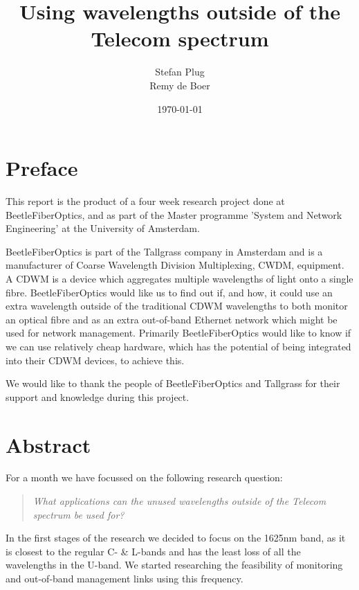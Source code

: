 \documentclass{article}
\begin{document}
\title{Using wavelengths outside of the Telecom spectrum}
\author{Stefan Plug\\Remy de Boer}
\date{\today}
\maketitle

\thispagestyle{empty}
\newpage

\section*{Preface}
This report is the product of a four week research project done at BeetleFiberOptics, and as part of the Master programme 'System and Network Engineering' at the University of Amsterdam\cite{uva:os3}.

BeetleFiberOptics is part of the Tallgrass company in Amsterdam and is a manufacturer of Coarse Wavelength Division Multiplexing, CWDM, equipment. A CDWM is a device which aggregates multiple wavelengths of light onto a single fibre. BeetleFiberOptics would like us to find out if, and how, it could use an extra wavelength outside of the traditional CDWM wavelengths to both monitor an optical fibre and as an extra out-of-band Ethernet network which might be used for network management. Primarily BeetleFiberOptics would like to know if we can use relatively cheap hardware, which has the potential of being integrated into their CDWM devices, to achieve this.

We would like to thank the people of BeetleFiberOptics and Tallgrass for their support and knowledge during this project.

\newpage
\section*{Abstract}
For a month we have focussed on the following research question:
\begin{quote}
\textit{
What applications can the unused wavelengths outside of the Telecom spectrum be used for?
}
\end{quote}
In the first stages of the research we decided to focus on the 1625nm band, as it is closest to the regular C- \& L-bands and has the least loss of all the wavelengths in the U-band.
We started researching the feasibility of monitoring and out-of-band management links using this frequency.
\end{document}
